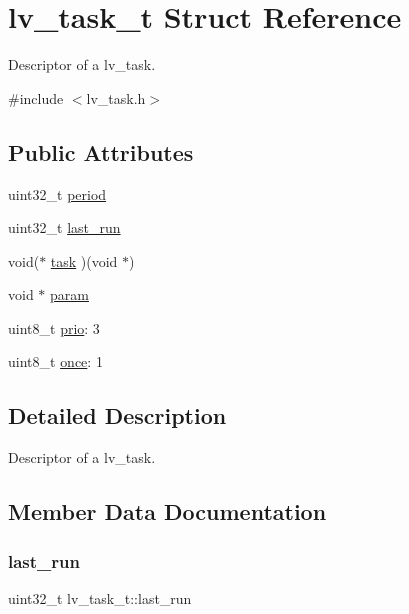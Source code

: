 \hypertarget{structlv__task__t}{}\section{lv\+\_\+task\+\_\+t Struct Reference}
\label{structlv__task__t}


Descriptor of a lv\+\_\+task.  




{\ttfamily \#include $<$lv\+\_\+task.\+h$>$}

\subsection*{Public Attributes}
\begin{DoxyCompactItemize}
\item 
uint32\+\_\+t \mbox{\hyperlink{structlv__task__t_ab2312571018df52165cbee9002845121}{period}}
\item 
uint32\+\_\+t \mbox{\hyperlink{structlv__task__t_a55113cb20c7d2f1faf47b192fe7a5b9a}{last\+\_\+run}}
\item 
void($\ast$ \mbox{\hyperlink{structlv__task__t_a81bcd122b91bc72bb358b4d03e60db1d}{task}} )(void $\ast$)
\item 
void $\ast$ \mbox{\hyperlink{structlv__task__t_a51641918b990f97c1cae127dee63ff82}{param}}
\item 
uint8\+\_\+t \mbox{\hyperlink{structlv__task__t_a18791b64e62795e52e64acdf9a632135}{prio}}\+: 3
\item 
uint8\+\_\+t \mbox{\hyperlink{structlv__task__t_a2cc8444292cebc37ae2b7bc08d131cae}{once}}\+: 1
\end{DoxyCompactItemize}


\subsection{Detailed Description}
Descriptor of a lv\+\_\+task. 

\subsection{Member Data Documentation}
\mbox{\label{structlv__task__t_a55113cb20c7d2f1faf47b192fe7a5b9a}} 
\subsubsection{\texorpdfstring{last\_run}{last\_run}}
{\footnotesize\ttfamily uint32\+\_\+t lv\+\_\+task\+\_\+t\+::last\+\_\+run}

